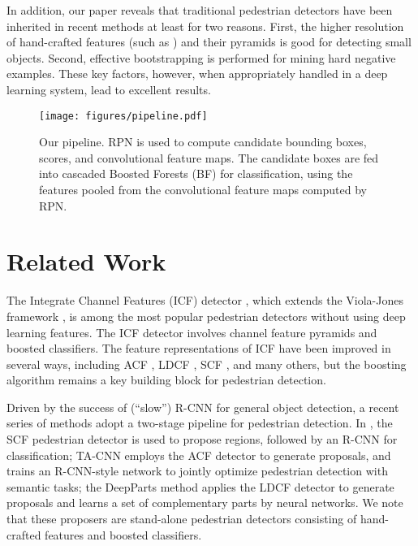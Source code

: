 \documentclass[runningheads]{llncs}
\begin{document}
In addition, our paper reveals that traditional pedestrian detectors have been inherited in recent methods at least for two reasons. First, the higher resolution of hand-crafted features (such as \cite{dollar2009integral,dollar2014fast}) and their pyramids is good for detecting small objects. Second, effective bootstrapping is performed for mining hard negative examples. These key factors, however, when appropriately handled in a deep learning system, lead to excellent results.

\begin{figure*}[t]
\centering
\texttt{[image: figures/pipeline.pdf]}
\caption{Our pipeline. RPN is used to compute candidate bounding boxes, scores, and convolutional feature maps. The candidate boxes are fed into cascaded Boosted Forests (BF) for classification, using the features pooled from the convolutional feature maps computed by RPN.}
\label{fig:overall-pipeline}
\end{figure*}

\section{Related Work}

The Integrate Channel Features (ICF) detector \cite{dollar2009integral}, which extends the Viola-Jones framework \cite{viola2004robust}, is among the most popular pedestrian detectors without using deep learning features.
The ICF detector involves channel feature pyramids and boosted classifiers. 
The feature representations of ICF have been improved in several ways, including ACF \cite{dollar2014fast}, LDCF \cite{nam2014local}, SCF \cite{benenson2014ten}, and many others, but the boosting algorithm remains a key building block for pedestrian detection.

Driven by the success of (``slow'') R-CNN \cite{girshick2014rich} for general object detection, a recent series of methods \cite{benenson2014ten,tian2015pedestrian,tian2015deep} adopt a two-stage pipeline for pedestrian detection. In \cite{hosang2015taking}, the SCF pedestrian detector \cite{benenson2014ten} is used to propose regions, followed by an R-CNN for classification; TA-CNN \cite{tian2015pedestrian} employs the ACF detector \cite{dollar2014fast} to generate proposals, and trains an R-CNN-style network to jointly optimize pedestrian detection with semantic tasks; the DeepParts method \cite{tian2015deep} applies the LDCF detector \cite{nam2014local} to generate proposals and learns a set of complementary parts by neural networks. We note that these proposers are stand-alone pedestrian detectors consisting of hand-crafted features and boosted classifiers.
\end{document}
